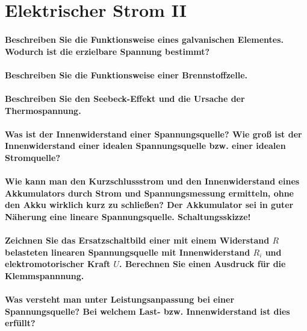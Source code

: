 \documentclass[a4paper, 11pt, parskip=half]{scrartcl}
\begin{document}
\newpage

\section{Elektrischer Strom II}

\paragraph{Beschreiben Sie die Funktionsweise eines galvanischen Elementes. Wodurch ist die
erzielbare Spannung bestimmt?}

\paragraph{Beschreiben Sie die Funktionsweise einer Brennstoffzelle.}

\paragraph{Beschreiben Sie den Seebeck-Effekt und die Ursache der Thermospannung.}

\paragraph{Was ist der Innenwiderstand einer Spannungsquelle? Wie groß ist der Innenwiderstand einer
idealen Spannungsquelle bzw. einer idealen Stromquelle?}

\paragraph{Wie kann man den Kurzschlussstrom und den Innenwiderstand eines Akkumulators durch
Strom und Spannungsmessung ermitteln, ohne den Akku wirklich kurz zu schließen? Der Akkumulator sei
in guter Näherung eine lineare Spannungsquelle. Schaltungsskizze!}

\paragraph{Zeichnen Sie das Ersatzschaltbild einer mit einem Widerstand $R$ belasteten linearen
Spannungsquelle mit Innenwiderstand $R_i$ und elektromotorischer Kraft $U$. Berechnen Sie einen
Ausdruck für die Klemmspannnung.}

\paragraph{Was versteht man unter Leistungsanpassung bei einer Spannungsquelle? Bei welchem Last-
bzw. Innenwiderstand ist dies erfüllt?}
\end{document}
